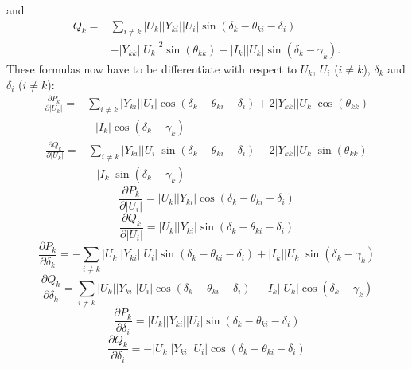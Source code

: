 and
\begin{equation}
	\begin{split}
		Q_k = 	& \sum_{i \ne k} |U_k| |Y_{ki}| |U_i| \sin \left( \delta_k - \theta_{ki} - \delta_i \right) \\
				& - |Y_{kk}| |U_k|^2 \sin \left( \theta_{kk} \right) - |I_k| |U_k| \sin \left( \delta_k - \gamma_k \right).
	\end{split}
\end{equation}
These formulas now have to be differentiate with respect to $U_k$, $U_i$ ($i \ne k$), $\delta_k$ and $\delta_i$ ($i \ne k$):
\begin{equation}
	\begin{split}
		\frac{\partial P_k}{\partial |U_k|} = 
			& \sum_{i \ne k} |Y_{ki}| |U_i| \cos \left( \delta_k - \theta_{ki} - \delta_i \right) + 2 |Y_{kk}| |U_k| \cos \left( \theta_{kk} \right) \\
			& - |I_k| \cos \left( \delta_k - \gamma_k \right)
	\end{split}
	\label{eq:pk_magnitudek}
\end{equation}
\begin{equation}
	\begin{split}
		\frac{\partial Q_k}{\partial |U_k|} = 
			& \sum_{i \ne k} |Y_{ki}| |U_i| \sin \left( \delta_k - \theta_{ki} - \delta_i \right) - 2 |Y_{kk}| |U_k| \sin \left( \theta_{kk} \right) \\
			& - |I_k| \sin \left( \delta_k - \gamma_k \right)
	\end{split}
	\label{eq:qk_magnitudek}
\end{equation}
\begin{equation}
	\frac{\partial P_k}{\partial |U_i|} = |U_k| |Y_{ki}| \cos \left( \delta_k - \theta_{ki} - \delta_i \right)
	\label{eq:pk_magnitudei}
\end{equation}
\begin{equation}
	\frac{\partial Q_k}{\partial |U_i|} = |U_k| |Y_{ki}| \sin \left( \delta_k - \theta_{ki} - \delta_i \right)
	\label{eq:qk_magnitudei}
\end{equation}
\begin{equation}
	\frac{\partial P_k}{\partial \delta_k} = - \sum_{i \ne k} |U_k| |Y_{ki}| |U_i| \sin \left( \delta_k - \theta_{ki} - \delta_i \right) + |I_k| |U_k| \sin \left( \delta_k - \gamma_k \right)
	\label{eq:pk_phasek}
\end{equation}
\begin{equation}
	\frac{\partial Q_k}{\partial \delta_k} = \sum_{i \ne k} |U_k| |Y_{ki}| |U_i| \cos \left( \delta_k - \theta_{ki} - \delta_i \right) - |I_k| |U_k| \cos \left( \delta_k - \gamma_k \right)
	\label{eq:qk_phasek}
\end{equation}
\begin{equation}
	\frac{\partial P_k}{\partial \delta_i} = |U_k| |Y_{ki}| |U_i| \sin \left( \delta_k - \theta_{ki} - \delta_i \right)
	\label{eq:pk_phasei}
\end{equation}
\begin{equation}
	\frac{\partial Q_k}{\partial \delta_i} = - |U_k| |Y_{ki}| |U_i| \cos \left( \delta_k - \theta_{ki} - \delta_i \right)
	\label{eq:qk_phasei}
\end{equation}

